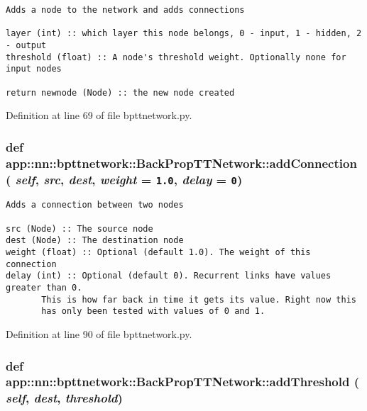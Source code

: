\footnotesize\begin{verbatim}Adds a node to the network and adds connections

layer (int) :: which layer this node belongs, 0 - input, 1 - hidden, 2 - output
threshold (float) :: A node's threshold weight. Optionally none for input nodes

return newnode (Node) :: the new node created
\end{verbatim}
\normalsize
 

Definition at line 69 of file bpttnetwork.py.
\subsubsection{\setlength{\rightskip}{0pt plus 5cm}def app::nn::bpttnetwork::BackPropTTNetwork::addConnection ( {\em self},  {\em src},  {\em dest},  {\em weight} = {\tt 1.0},  {\em delay} = {\tt 0})}\label{classapp_1_1nn_1_1bpttnetwork_1_1BackPropTTNetwork_d49a2b12a53782ea2ec1e0a0803ae753}




\footnotesize\begin{verbatim}Adds a connection between two nodes

src (Node) :: The source node
dest (Node) :: The destination node
weight (float) :: Optional (default 1.0). The weight of this connection
delay (int) :: Optional (default 0). Recurrent links have values greater than 0.
       This is how far back in time it gets its value. Right now this
       has only been tested with values of 0 and 1.
\end{verbatim}
\normalsize
 

Definition at line 90 of file bpttnetwork.py.
\subsubsection{\setlength{\rightskip}{0pt plus 5cm}def app::nn::bpttnetwork::BackPropTTNetwork::addThreshold ( {\em self},  {\em dest},  {\em threshold})}\label{classapp_1_1nn_1_1bpttnetwork_1_1BackPropTTNetwork_e4afc69ae098bf9f6d5fa2eb9b82c68f}




